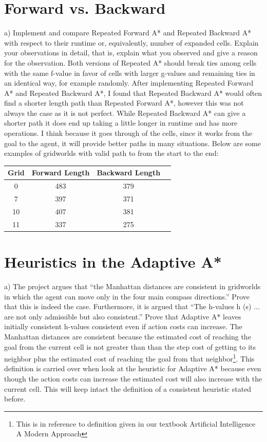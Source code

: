\documentclass{article}
\begin{document}
\section{Forward vs. Backward}
a) Implement and compare Repeated Forward A* and Repeated Backward A* with respect to their runtime or, equivalently, number of expanded cells. Explain your observations in detail, that is, explain what you observed and give a reason for the observation. Both versions of Repeated A* should break ties among cells with the same f-value in favor of cells with larger g-values and remaining ties in an identical way, for example randomly.\hfill \break \break
After implementing Repeated Forward A* and Repeated Backward A*, I found that Repeated Backward A* would often find a shorter length path than Repeated Forward A*, however this was not always the case as it is not perfect. While Repeated Backward A* can give a shorter path it does end up taking a little longer in runtime and has more operations. I think because it goes through of the cells, since it works from the goal to the agent, it will provide better paths in many situations. Below are some examples of gridworlds with valid path to from the start to the end: 
\begin{center}
\begin{tabular}{ |c|c|c|c| } 
\hline
Grid & Forward Length & Backward Length \\
\hline
0 & 483 & 379\\ 
7 & 397 & 371\\
10 & 407 & 381\\
11 & 337 & 275\\
\hline
\end{tabular}
\end{center}
\section{Heuristics in the Adaptive A*}
a) The project argues that “the Manhattan distances are consistent in gridworlds in which the agent can move only in the four main compass directions.” Prove that this is indeed the case. Furthermore, it is argued that “The h-values h (s) ... are not only admissible but also consistent.” Prove that Adaptive A* leaves initially consistent h-values consistent even if action costs can increase.\hfill \break \break
The Manhattan distances are consistent because the estimated cost of reaching the goal from the current cell is not greater than than the step cost of getting to its neighbor plus the estimated cost of reaching the goal from that neighbor\footnote{This is in reference to definition given in our textbook Artificial Intelligence A Modern Approach}. This definition is carried over when look at the heuristic for Adaptive A* because even though the action costs can increase the estimated cost will also increase with the current cell. This will keep intact the definition of a consistent heuristic stated before.
\end{document}
